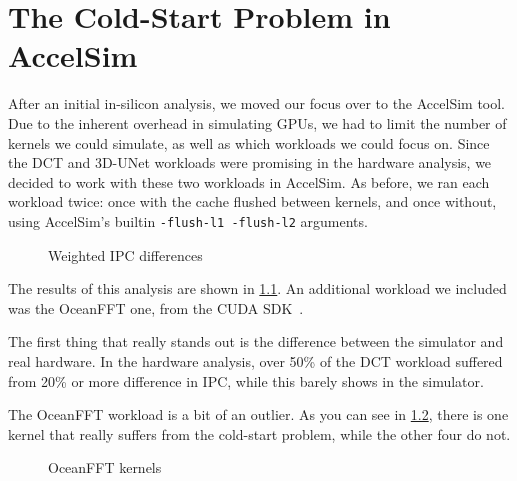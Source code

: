 \chapter{The Cold-Start Problem in AccelSim}\label{ch:sim-analysis}

After an initial in-silicon analysis, we moved our focus over to the AccelSim tool.
Due to the inherent overhead in simulating GPUs, we had to limit the number of kernels we could simulate, as well as which workloads we could focus on.
Since the DCT and 3D-UNet workloads were promising in the hardware analysis, we decided to work with these two workloads in AccelSim.
As before, we ran each workload twice: once with the cache flushed between kernels, and once without, using AccelSim's builtin \verb|-flush-l1 -flush-l2| arguments.

\begin{figure}
    \centering
    \begin{minipage}[c]{0.45\textwidth}
        \resizebox{\textwidth}{!}{}
    \end{minipage}
    \begin{minipage}[c]{0.45\textwidth}
        \resizebox{\textwidth}{!}{}
    \end{minipage}
    \caption{Weighted IPC differences}
    \label{fig:sim_ipc_diff}
\end{figure}

The results of this analysis are shown in \cref{fig:sim_ipc_diff}.
An additional workload we included was the OceanFFT one, from the CUDA SDK\ .

The first thing that really stands out is the difference between the simulator and real hardware.
In the hardware analysis, over 50\% of the DCT workload suffered from 20\% or more difference in IPC, while this barely shows in the simulator.

The OceanFFT workload is a bit of an outlier.
As you can see in \cref{fig:ocean_kernels}, there is one kernel that really suffers from the cold-start problem, while the other four do not.

\begin{figure}
    \centering
    
    \caption{OceanFFT kernels}
    \label{fig:ocean_kernels}
\end{figure}
